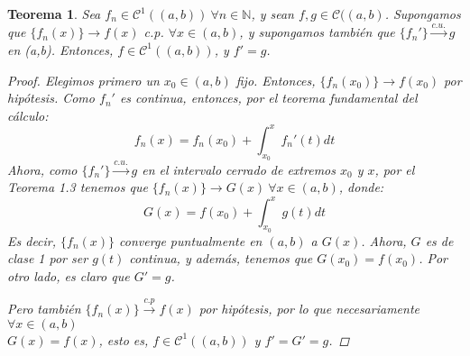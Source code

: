 \documentclass[11pt, a4paper]{article}
\theoremstyle{theorem-style}
\newtheorem{nth}{Teorema}[section]
\theoremstyle{definition-style}
\theoremstyle{remark-style}
\theoremstyle{example-style}
\begin{document}
\begin{nth}
	Sea $f_n\in \mathcal{C}^1((a,b)) \ \forall n \in \mathbb{N}$, y sean $f,g \in \mathcal{C}((a,b)$. Supongamos que $ \{f_n(x)\} \to f(x)$ c.p. $\forall x \in (a,b)$, y supongamos también que $\{f_n'\} \xrightarrow{c.u.} g $ en (a,b). Entonces, $f \in \mathcal{C}^1((a,b))$, y $f' = g$.
	
\begin{proof}
	Elegimos primero un $x_0 \in (a,b)$ fijo. Entonces, $\{f_n(x_0)\} \to f(x_0)$ por hipótesis.
	Como $f_n'$ es continua, entonces, por el teorema fundamental del cálculo:
	\[
	f_n(x) = f_n(x_0) + \int_{x_0}^x f_n'(t)dt
	\]
	Ahora, como  $\{f_n'\} \xrightarrow{c.u.} g $ en el intervalo cerrado de extremos $x_0$ y $x$, por el \textit{Teorema 1.3} tenemos que $\{f_n(x)\} \to G(x)\ \forall x \in (a,b)$, donde:
	\[
	    G(x) = f(x_0) + \int_{x_0}^x g(t)dt
	\]
	Es decir, $\{f_n(x)\}$ converge puntualmente en $(a,b)$ a $G(x)$. Ahora, $G$ es de clase 1 por ser $g(t)$ continua, y además, tenemos que $G(x_0) = f(x_0)$.
	Por otro lado, es claro que $G' = g$.
	
	Pero también $\{f_n(x)\} \xrightarrow {c.p} f(x)$ por hipótesis, por lo que necesariamente $\forall x \in (a,b)$ \\ $G(x) = f(x)$, esto es, $f \in \mathcal{C}^1((a,b))$ y $f' = G' = g$.
\end{proof}
\end{nth}
\end{document}
